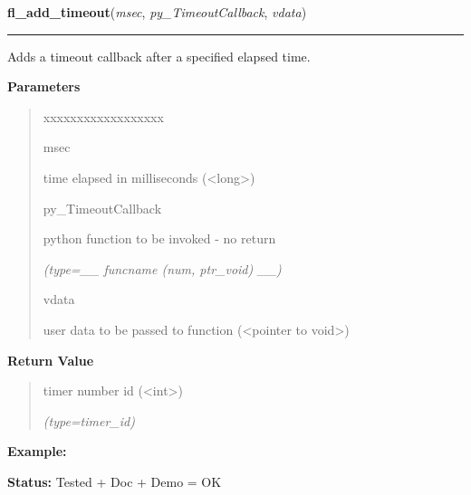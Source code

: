 \hspace{.8\funcindent}\begin{boxedminipage}{\funcwidth}

    \raggedright \textbf{fl\_add\_timeout}(\textit{msec}, \textit{py\_TimeoutCallback}, \textit{vdata})

    \vspace{-1.5ex}

    \rule{\textwidth}{0.5\fboxrule}
\setlength{\parskip}{2ex}
    Adds a timeout callback after a specified elapsed time.

\setlength{\parskip}{1ex}
      \textbf{Parameters}
      \vspace{-1ex}

      \begin{quote}
        \begin{Ventry}{xxxxxxxxxxxxxxxxxx}

          \item[msec]

          time elapsed in milliseconds ({\textless}long{\textgreater})

          \item[py\_TimeoutCallback]

          python function to be invoked - no return

            {\it (type=\_\_ funcname (num, ptr\_void) \_\_)}

          \item[vdata]

          user data to be passed to function ({\textless}pointer to 
          void{\textgreater})

        \end{Ventry}

      \end{quote}

      \textbf{Return Value}
    \vspace{-1ex}

      \begin{quote}
      timer number id ({\textless}int{\textgreater})

      {\it (type=timer\_id)}

      \end{quote}

\textbf{Example:} 

\textbf{Status:} Tested + Doc + Demo = OK



    \end{boxedminipage}

